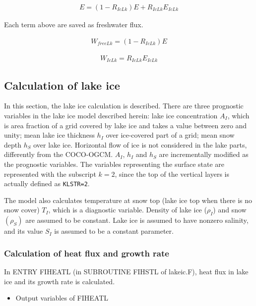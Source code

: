 \begin{eqnarray}
    E=(1-R_{IcLk})E + R_{IcLk}E_{IcLk}
\end{eqnarray}

Each term above are saved as freshwater flux.

\begin{eqnarray}
    W_{freeLk} = (1-R_{IcLk}) E
\end{eqnarray}

\begin{eqnarray}
    W_{IcLk} = R_{IcLk} E_{IcLk}
\end{eqnarray}

\hypertarget{calculation-of-lake-ice}{%
\subsection{Calculation of lake ice}\label{calculation-of-lake-ice}}

In this section, the lake ice calculation is described. There are three prognostic variables in the lake ice model described herein: lake ice concentration \(A_I\), which is area fraction of a grid
covered by lake ice and takes a value between zero and unity; mean lake ice thickness \(h_I\) over ice-covered part of a grid; mean snow depth \(h_S\) over lake ice. Horizontal flow of ice is not
considered in the lake parts, differently from the COCO-OGCM. \(A_I\), \(h_I\) and \(h_S\) are incrementally modified as the prognostic variables. The variables representing the surface state are
represented with the subscript \(k=2\), since the top of the vertical layers is actually defined as \texttt{KLSTR=2}.

The model also calculates temperature at snow top (lake ice top when there is no snow cover) \(T_I\), which is a diagnostic variable. Density of lake ice (\(\rho_I\)) and snow \((\rho_S)\) are assumed
to be constant. Lake ice is assumed to have nonzero salinity, and its value \(S_I\) is assumed to be a constant parameter.

\hypertarget{calculation-of-heat-flux-and-growth-rate}{%
\subsubsection{Calculation of heat flux and growth rate}\label{calculation-of-heat-flux-and-growth-rate}}

In ENTRY FIHEATL (in SUBROUTINE FIHSTL of lakeic.F), heat flux in lake ice and its growth rate is calculated.

\begin{itemize}
\tightlist
\item
  Output variables of FIHEATL
\end{itemize}

